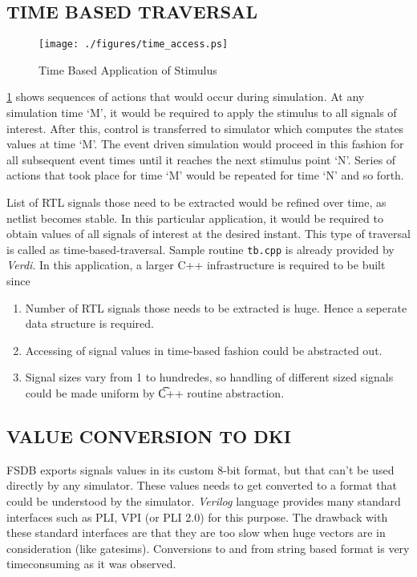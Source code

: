 \subsection{TIME BASED TRAVERSAL}
\begin{figure}[h]
\centering
\texttt{[image: ./figures/time\_access.ps]}
\caption{Time Based Application of Stimulus}
\label{fig:dualsim:tbas}
\end{figure}

\figurename{\ref{fig:dualsim:tbas}} shows sequences of actions that would occur during simulation. At any simulation time `M', it would be required to apply the stimulus to all signals of interest. After  this, control is transferred to simulator which computes  the states values at time `M'. The event driven simulation  would proceed in this fashion for all subsequent event times until it reaches the next stimulus point `N'. Series of actions that took place for time `M' would be repeated for time `N'  and so forth.

List of RTL signals those need to be extracted would be refined over time, as netlist becomes stable. In this particular application, it would  be required  to obtain values of all signals of interest at the desired  instant. This type of traversal is called as time-based-traversal. Sample routine \texttt{tb.cpp}\cite[p.~28]{Verdi:FsdbReader} is already provided by {\it Verdi}. In this application, a larger C++ infrastructure is required to be built since
\begin{enumerate}
\item Number of RTL signals those needs to be extracted is huge. Hence a seperate data structure is required.
\item Accessing of signal values in time-based fashion could be abstracted out.
\item Signal sizes vary from 1 to hundredes, so handling of different sized signals could be made uniform by {\t C++} routine abstraction.
\end{enumerate}


\subsection{VALUE CONVERSION TO DKI}
FSDB exports signals values in its custom 8-bit format, but that can't be used directly by any simulator. These values needs to get converted to a format that could be understood by the simulator. {\it Verilog} language\cite{ieee:v:2005} provides many standard interfaces such as PLI, VPI (or PLI 2.0) for this purpose. The drawback with these standard interfaces are that they are too slow when huge vectors are in consideration (like gatesims). Conversions to and from string based format is very timeconsuming as it was observed.

